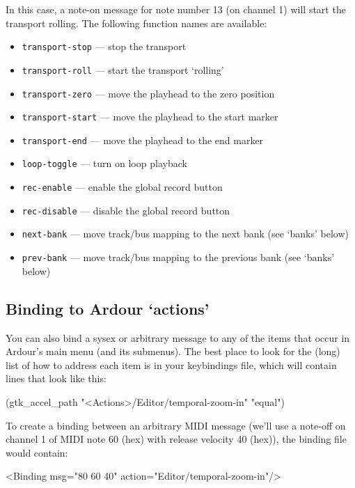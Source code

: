 \documentclass[10pt,a4paper]{book}
\begin{document}
In this case, a note-on message for note number 13 (on channel 1) will
start the transport rolling. The following function names are
available:

\begin{itemize}
\item \texttt{transport-stop} --- stop the transport 
\item \texttt{transport-roll} --- start the transport `rolling'
\item \texttt{transport-zero} --- move the playhead to the zero position 
\item \texttt{transport-start} --- move the playhead to the start marker 
\item \texttt{transport-end} --- move the playhead to the end marker 
\item \texttt{loop-toggle} --- turn on loop playback 
\item \texttt{rec-enable} --- enable the global record button 
\item \texttt{rec-disable} --- disable the global record button 
\item \texttt{next-bank} --- move track/bus mapping to the next bank (see `banks' below) 
\item \texttt{prev-bank} --- move track/bus mapping to the previous bank (see `banks' below) 
\end{itemize}

\subsection{Binding to Ardour `actions'}

You can also bind a sysex or arbitrary message to any of the items
that occur in Ardour's main menu (and its submenus). The best place to
look for the (long) list of how to address each item is in your
keybindings file, which will contain lines that look like this:

\begin{listing}
(gtk\_accel\_path "<Actions>/Editor/temporal-zoom-in" "equal")
\end{listing}

To create a binding between an arbitrary MIDI message (we'll use a
note-off on channel 1 of MIDI note 60 (hex) with release velocity 40
(hex)), the binding file would contain:

\begin{listing}
<Binding msg="80 60 40" action="Editor/temporal-zoom-in"/>
\end{listing}
\end{document}
